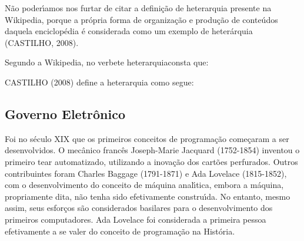 \documentclass[
12pt,		%
openright,	%
twoside,  %
a4paper,			%
chapter=TITLE,		%
english,			%
french,				%
spanish,			%
brazil				%
]{USPSC-classe/USPSC}
\begin{document}
N\~ao poder\'{\i}amos nos furtar de citar a defini\c{c}\~ao de heterarquia presente na Wikipedia, porque a pr\'opria forma de organiza\c{c}\~ao e produ\c{c}\~ao de conte\'udos daquela enciclop\'edia \'e considerada como um exemplo de heter\'arquia  (CASTILHO, 2008).




Segundo a Wikipedia, no verbete \textquotedbl heterarquia\textquotedbl  consta que:





\noindent\begin{center}\mbox{\centering{}}\end{center}


 CASTILHO (2008) define a heterarquia como segue:





\noindent\begin{center}\mbox{\centering{}}\end{center}


\subsection[Governo Eletr\^onico]{Governo Eletr\^onico}\label{Governo Eletr\^onico}
Foi no s\'eculo XIX que os primeiros conceitos de programa\c{c}\~ao come\c{c}aram a ser desenvolvidos. O mec\^anico franc\^es Joseph-Marie Jacquard (1752-1854) inventou o primeiro tear automatizado, utilizando a inova\c{c}\~ao dos cart\~oes perfurados. Outros contribuintes foram Charles Baggage (1791-1871) e Ada Lovelace (1815-1852), com o desenvolvimento do conceito de m\'aquina anal\'{\i}tica, embora a m\'aquina, propriamente dita, n\~ao tenha sido efetivamente constru\'{\i}da. No entanto, mesmo assim, seus esfor\c{c}os s\~ao considerados basilares para o desenvolvimento dos primeiros computadores. Ada Lovelace foi considerada a primeira pessoa efetivamente a se valer do conceito de programa\c{c}\~ao na Hist\'oria.
\end{document}
